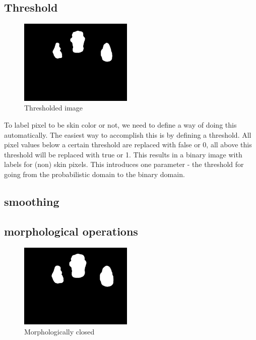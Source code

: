 \subsection*{Threshold}

\begin{figure}
  \vspace{-20pt}
  \begin{center}
    \includegraphics[width=0.48\textwidth]{figures/pipeline/thresholded.jpg}
 \end{center}
  \vspace{-20pt}
	\caption{Thresholded image}
	\label{fig:threshold}
  \vspace{-10pt}
\end{figure}


To label pixel to be skin color or not, we need to define a way of doing this automatically. The easiest way to accomplish this is by defining a threshold. All pixel values below a certain threshold are replaced with false or 0, all above this threshold will be replaced with true or 1. This results in a binary image with labels for (non) skin pixels. This introduces one parameter - the threshold for going from the probabilistic domain to the binary domain.

\subsection*{smoothing}


\subsection*{morphological operations}
\begin{figure}
  \vspace{-20pt}
  \begin{center}
    \includegraphics[width=0.48\textwidth]{figures/pipeline/closed.jpg}
 \end{center}
  \vspace{-20pt}
	\caption{Morphologically closed}
	\label{fig:closed}
  \vspace{-10pt}
\end{figure}

